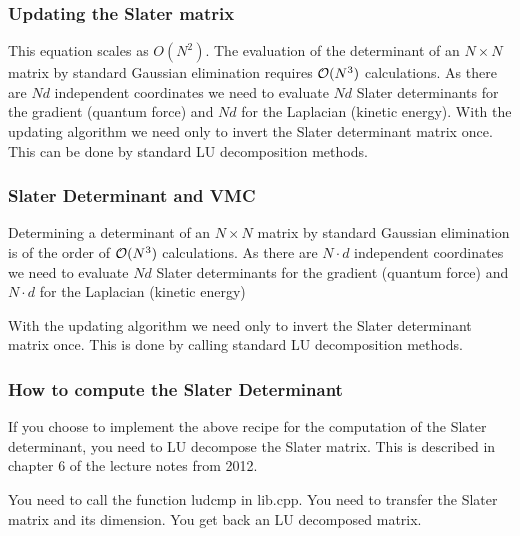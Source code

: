 \documentclass[compress]{beamer}
\begin{document}
\frame
{
  \frametitle{Updating the Slater matrix}
\begin{small}
{\scriptsize
This equation scales as $O(N^2)$.
The evaluation of the determinant of an $N \times N$ matrix by standard Gaussian elimination requires ${\cal O}(N^3)$
calculations. 
As there are $Nd$ independent coordinates we need to evaluate $Nd$ Slater determinants 
for the gradient (quantum force) and $Nd$ for the Laplacian (kinetic energy). 
With the updating algorithm we need only to invert the Slater 
determinant matrix once. This can be done by standard LU decomposition methods.\\

}
\end{small}
}





\frame
{
  \frametitle{Slater Determinant and  VMC}
\begin{small}
{\scriptsize

Determining a determinant of an $N \times N$ matrix by
standard Gaussian elimination is of the order of ${\cal O}(N^3)$
calculations. As there are $N\cdot d$ independent coordinates we need
to evaluate $Nd$ Slater determinants for the gradient (quantum force) and
$N\cdot d$ for the Laplacian (kinetic energy)

With the updating algorithm we need only to invert the Slater determinant matrix once.
This is done by calling standard LU decomposition methods.
}
\end{small}
}





\frame
{
  \frametitle{How to compute the Slater Determinant}
\begin{small}
{\scriptsize
If you choose to implement the above recipe for the computation of the Slater determinant,
you need to LU decompose the Slater matrix. This is described in chapter 6 of the lecture notes from 2012.

You need to call the function ludcmp in lib.cpp.
You need to transfer the Slater matrix and its dimension. You get back an LU decomposed matrix.
}
\end{small}
}
\end{document}
